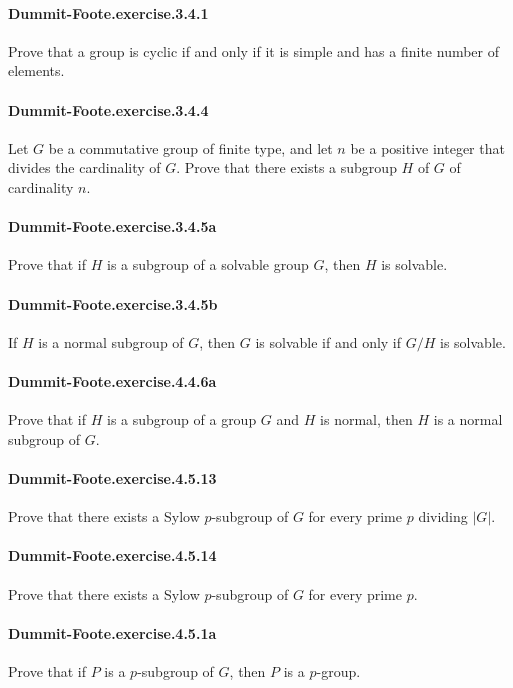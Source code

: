 \documentclass{article}
\begin{document}
\paragraph{Dummit-Foote.exercise.3.4.1} Prove that a group is cyclic if and only if it is simple and has a finite number of elements.

\paragraph{Dummit-Foote.exercise.3.4.4} Let $G$ be a commutative group of finite type, and let $n$ be a positive integer that divides the cardinality of $G$. Prove that there exists a subgroup $H$ of $G$ of cardinality $n$.

\paragraph{Dummit-Foote.exercise.3.4.5a} Prove that if $H$ is a subgroup of a solvable group $G$, then $H$ is solvable.

\paragraph{Dummit-Foote.exercise.3.4.5b} If $H$ is a normal subgroup of $G$, then $G$ is solvable if and only if $G/H$ is solvable.

\paragraph{Dummit-Foote.exercise.4.4.6a} Prove that if $H$ is a subgroup of a group $G$ and $H$ is normal, then $H$ is a normal subgroup of $G$.

\paragraph{Dummit-Foote.exercise.4.5.13} Prove that there exists a Sylow $p$-subgroup of $G$ for every prime $p$ dividing $|G|$.

\paragraph{Dummit-Foote.exercise.4.5.14} Prove that there exists a Sylow $p$-subgroup of $G$ for every prime $p$.

\paragraph{Dummit-Foote.exercise.4.5.1a} Prove that if $P$ is a $p$-subgroup of $G$, then $P$ is a $p$-group.
\end{document}
